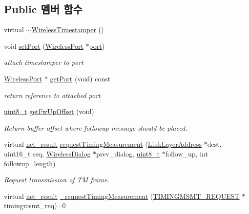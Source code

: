 \subsection*{Public 멤버 함수}
\begin{DoxyCompactItemize}
\item 
virtual \hyperlink{class_wireless_timestamper_ac1b4f5d4d5b2042d320f1a2b331cc27d}{$\sim$\+Wireless\+Timestamper} ()
\item 
void \hyperlink{class_wireless_timestamper_a66e2a2630f5a4667a1e79cbadbc052ac}{set\+Port} (\hyperlink{class_wireless_port}{Wireless\+Port} $\ast$\hyperlink{class_wireless_timestamper_a16e2f76ce8715713c1d3db843c27d2d3}{port})
\begin{DoxyCompactList}\small\item\em attach timestamper to port \end{DoxyCompactList}\item 
\hyperlink{class_wireless_port}{Wireless\+Port} $\ast$ \hyperlink{class_wireless_timestamper_aad42db1d6ccc40f2bebc5ba544d738d8}{get\+Port} (void) const 
\begin{DoxyCompactList}\small\item\em return reference to attached port \end{DoxyCompactList}\item 
\hyperlink{stdint_8h_aba7bc1797add20fe3efdf37ced1182c5}{uint8\+\_\+t} \hyperlink{class_wireless_timestamper_aa3f9c98559377e4d96f78583486f3154}{get\+Fw\+Up\+Offset} (void)
\begin{DoxyCompactList}\small\item\em Return buffer offset where followup message should be placed. \end{DoxyCompactList}\item 
virtual \hyperlink{avbts__osnet_8hpp_a21b2b4b5e479ef3adfc039ac30c961cd}{net\+\_\+result} \hyperlink{class_wireless_timestamper_a7647a2952736825775d90d6d5c5dca76}{request\+Timing\+Measurement} (\hyperlink{class_link_layer_address}{Link\+Layer\+Address} $\ast$dest, uint16\+\_\+t seq, \hyperlink{class_wireless_dialog}{Wireless\+Dialog} $\ast$prev\+\_\+dialog, \hyperlink{stdint_8h_aba7bc1797add20fe3efdf37ced1182c5}{uint8\+\_\+t} $\ast$follow\+\_\+up, int followup\+\_\+length)
\begin{DoxyCompactList}\small\item\em Request transmission of TM frame. \end{DoxyCompactList}\item 
virtual \hyperlink{avbts__osnet_8hpp_a21b2b4b5e479ef3adfc039ac30c961cd}{net\+\_\+result} \hyperlink{class_wireless_timestamper_a7834328127f7bb27d200da470053a343}{\+\_\+request\+Timing\+Measurement} (\hyperlink{wireless__tstamper_8hpp_a5830b5c9301af6c6ba8f730db5a4b571}{T\+I\+M\+I\+N\+G\+M\+S\+M\+T\+\_\+\+R\+E\+Q\+U\+E\+ST} $\ast$timingmsmt\+\_\+req)=0

\end{DoxyCompactItemize}
